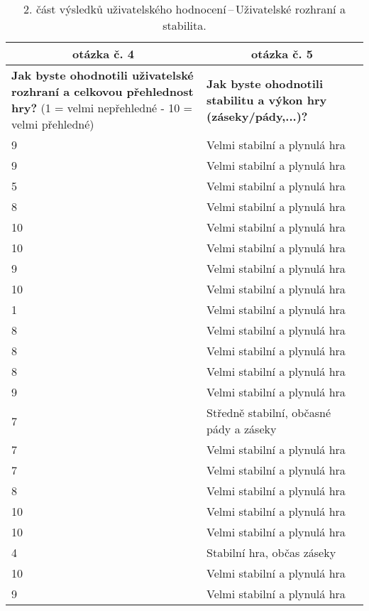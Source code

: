 \begin{table}[htbp]
\centering
\begin{tabularx}{\textwidth}{|X|X|}
\hline
\multicolumn{1}{|c|}{\textbf{otázka č. 4}} & \multicolumn{1}{c|}{\textbf{otázka č. 5}} \\ \hline
\textbf{Jak byste ohodnotili uživatelské rozhraní a celkovou přehlednost hry?} (1 = velmi nepřehledné - 10 = velmi přehledné) & \textbf{Jak byste ohodnotili stabilitu a výkon hry (záseky/pády,...)?} \\ \hline
9 & Velmi stabilní a plynulá hra \\ \hline
9 & Velmi stabilní a plynulá hra \\ \hline
5 & Velmi stabilní a plynulá hra \\ \hline
8 & Velmi stabilní a plynulá hra \\ \hline
10 & Velmi stabilní a plynulá hra \\ \hline
10 & Velmi stabilní a plynulá hra \\ \hline
9 & Velmi stabilní a plynulá hra \\ \hline
10 & Velmi stabilní a plynulá hra \\ \hline
1 & Velmi stabilní a plynulá hra \\ \hline
8 & Velmi stabilní a plynulá hra \\ \hline
8 & Velmi stabilní a plynulá hra \\ \hline
8 & Velmi stabilní a plynulá hra \\ \hline
9 & Velmi stabilní a plynulá hra \\ \hline
7 & Středně stabilní, občasné pády a záseky \\ \hline
7 & Velmi stabilní a plynulá hra \\ \hline
7 & Velmi stabilní a plynulá hra \\ \hline
8 & Velmi stabilní a plynulá hra \\ \hline
10 & Velmi stabilní a plynulá hra \\ \hline
10 & Velmi stabilní a plynulá hra \\ \hline
4 & Stabilní hra, občas záseky \\ \hline
10 & Velmi stabilní a plynulá hra \\ \hline
9 & Velmi stabilní a plynulá hra \\ \hline
\end{tabularx}
\caption{2. část výsledků uživatelského hodnocení\,--\,Uživatelské rozhraní a stabilita.}
\end{table}

